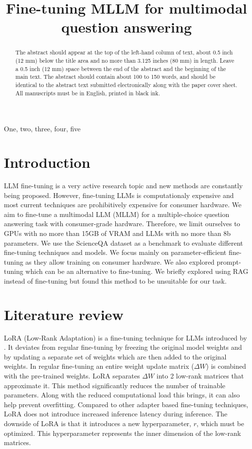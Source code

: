 \documentclass{article}
\title{Fine-tuning MLLM for multimodal question answering}
\begin{document}
%
\maketitle
%
\begin{abstract}
The abstract should appear at the top of the left-hand column of text, about
0.5 inch (12 mm) below the title area and no more than 3.125 inches (80 mm) in
length.  Leave a 0.5 inch (12 mm) space between the end of the abstract and the
beginning of the main text.  The abstract should contain about 100 to 150
words, and should be identical to the abstract text submitted electronically
along with the paper cover sheet.  All manuscripts must be in English, printed
in black ink.
\end{abstract}
%
\begin{keywords}
One, two, three, four, five
\end{keywords}
%
\section{Introduction}
\label{sec:intro}
LLM fine-tuning is a very active research topic and new methods are constantly being proposed. However, fine-tuning LLMs is computationaly expensive and most current techniques are prohibitively expensive for consumer hardware. We aim to fine-tune a multimodal LLM (MLLM) for a multiple-choice question answering task with consumer-grade hardware. Therefore, we limit ourselves to GPUs with no more than 15GB of VRAM and LLMs with no more than 8b parameters. We use the ScienceQA dataset as a benchmark to evaluate different fine-tuning techniques and models. We focus mainly on parameter-efficient fine-tuning as they allow training on consumer hardware. We also explored prompt-tuning which can be an alternative to fine-tuning. We briefly explored using RAG instead of fine-tuning but found this method to be unsuitable for our task.

\section{Literature review}
\label{sec:litreview}

LoRA (Low-Rank Adaptation) is a fine-tuning technique for LLMs introduced by \cite{lora}. It deviates from regular fine-tuning by freezing the original model weights and by updating a separate set of weights which are then added to the original weights. In regular fine-tuning an entire weight update matrix ($\Delta W$) is combined with the pre-trained weights. LoRA separates $\Delta W$ into 2 low-rank matrices that approximate it. This method significantly reduces the number of trainable parameters. Along with the reduced computational load this brings, it can also help prevent overfitting. Compared to other adapter based fine-tuning techniques, LoRA does not introduce increased inference latency during inference. The downside of LoRA is that it introduces a new hyperparameter, $r$, which must be optimized. This hyperparameter represents the inner dimension of the low-rank matrices.\par
\end{document}
